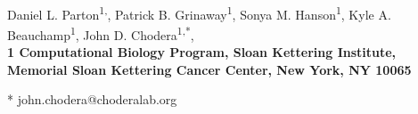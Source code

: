\documentclass[10pt,letterpaper]{article}
\date{}
\begin{document}
\vspace*{0.35in}

\begin{flushleft}
{\Large
\textbf{}
}
\newline
\\
Daniel L. Parton\textsuperscript{1,},
Patrick B. Grinaway\textsuperscript{1},
Sonya M. Hanson\textsuperscript{1},
Kyle A. Beauchamp\textsuperscript{1},
John D. Chodera\textsuperscript{1,*},
\\
\bigskip
\bf{1} Computational Biology Program, Sloan Kettering Institute, Memorial Sloan Kettering Cancer Center, New York, NY 10065
\\
\bigskip

% 
%

* john.chodera@choderalab.org

\end{flushleft}
\end{document}
